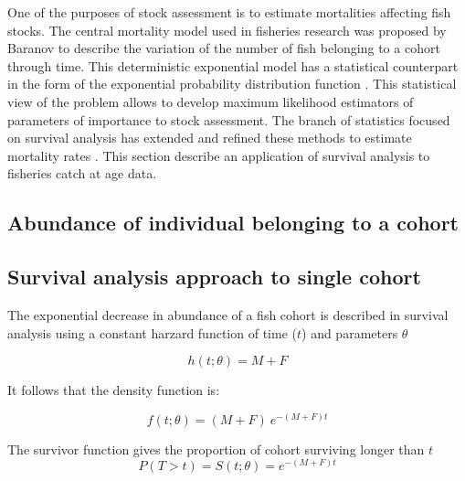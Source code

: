 One of the purposes of stock assessment is to estimate mortalities affecting fish stocks. The central mortality model used in fisheries research was proposed by Baranov \citep{quin99b} to describe the variation of the number of fish belonging to a cohort through time. This deterministic exponential model has a statistical counterpart in the form of the exponential probability distribution function \citep{cow98b}. This statistical view of the problem allows to develop maximum likelihood estimators \citep{Burnb03} of parameters of importance to stock assessment. The branch of statistics focused on survival analysis has extended and refined these methods to estimate mortality rates \citep{cox84b}. This section describe an application of survival analysis to fisheries catch at age data.


\subsection{Abundance of individual belonging to a cohort} 

\subsection{Survival analysis approach to single cohort}

The exponential decrease in abundance of a fish cohort is described in survival analysis \citep{cox84b} using a constant harzard function of time ($t$) and parameters $\theta$

\begin{equation}
h(t; \theta) = M + F
\end{equation}

It follows that the density function is:

\begin{equation}
f(t; \theta) = (M + F) \ e^{-(M+F)t}
\end{equation}

The survivor function gives the proportion of cohort surviving longer than $t$ \citep{kleinbaum2005survival}
\begin{equation}
P(T>t) = S(t; \theta) = e^{-(M+F)t}
\end{equation}

